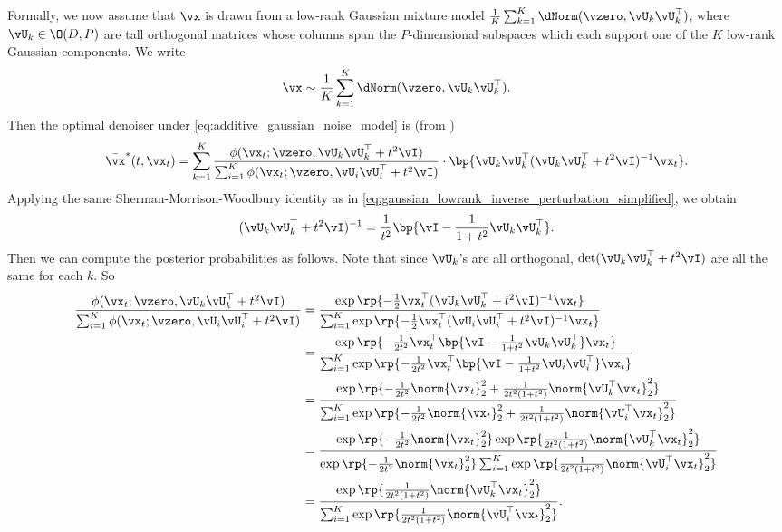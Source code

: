 \documentclass[../../book-main.tex]{subfiles}
\begin{document}
Formally, we now assume that \(\vx\) is drawn from a low-rank Gaussian mixture model \(\frac{1}{K}\sum_{k = 1}^{K}\dNorm(\vzero, \vU_{k}\vU_{k}^{\top})\), where  \(\vU_{k} \in \O(D, P)\) are tall orthogonal matrices whose columns span the \(P\)-dimensional subspaces which each support one of the \(K\) low-rank Gaussian components. We write
\begin{equation}\label{eq:MoG1}
	\vx \sim \frac{1}{K}\sum_{k = 1}^{K}\dNorm(\vzero, \vU_{k}\vU_{k}^{\top}).
\end{equation}
Then the optimal denoiser under \eqref{eq:additive_gaussian_noise_model} is (from )
\begin{equation} 
	\bar{\vx}^{\ast}(t, \vx_{t}) = \sum_{k = 1}^{K}\frac{\phi(\vx_{t} ; \vzero,
	\vU_{k}\vU_{k}^{\top} + t^{2}\vI)}{\sum_{i = 1}^{K}\phi(\vx_{t} ; \vzero, \vU_{i}\vU_{i}^{\top} + t^{2}\vI)}\cdot\bp{\vU_{k}\vU_{k}^{\top}(\vU_{k}\vU_{k}^{\top} + t^{2}\vI)^{-1}\vx_{t}}.
\end{equation}
Applying the same Sherman-Morrison-Woodbury identity as in \eqref{eq:gaussian_lowrank_inverse_perturbation_simplified}, we obtain
\begin{equation}
	(\vU_{k}\vU_{k}^{\top} + t^{2}\vI)^{-1} = \frac{1}{t^{2}}\bp{\vI - \frac{1}{1 + t^{2}}\vU_{k}\vU_{k}^{\top}}.
\end{equation}
Then we can compute the posterior probabilities as follows. Note that since \(\vU_{k}\)'s are all orthogonal, \(\det(\vU_{k}\vU_{k}^{\top} + t^{2}\vI)\) are all the same for each \(k\). So
\begin{align}
	\frac{\phi(\vx_{t} ; \vzero, \vU_{k}\vU_{k}^{\top} + t^{2}\vI)}{\sum_{i
	= 1}^{K}\phi(\vx_{t} ; \vzero, \vU_{i}\vU_{i}^{\top} + t^{2}\vI)} 
	&= \frac{\exp\rp{-\frac{1}{2}\vx_{t}^{\top}(\vU_{k}\vU_{k}^{\top} + t^{2}\vI)^{-1}\vx_{t}}}{\sum_{i = 1}^{K}\exp\rp{-\frac{1}{2}\vx_{t}^{\top}(\vU_{i}\vU_{i}^{\top} + t^{2}\vI)^{-1}\vx_{t}}} \\
	&= \frac{\exp\rp{-\frac{1}{2t^{2}}\vx_{t}^{\top}\bp{\vI - \frac{1}{1 + t^{2}}\vU_{k}\vU_{k}^{\top}}\vx_{t}}}{\sum_{i = 1}^{K}\exp\rp{-\frac{1}{2t^{2}}\vx_{t}^{\top}\bp{\vI - \frac{1}{1 + t^{2}}\vU_{i}\vU_{i}^{\top}}\vx_{t}}} \\
	&= \frac{\exp\rp{-\frac{1}{2t^{2}}\norm{\vx_{t}}_{2}^{2} + \frac{1}{2t^{2}(1 + t^{2})}\norm{\vU_{k}^{\top}\vx_{t}}_{2}^{2}}}{\sum_{i = 1}^{K}\exp\rp{-\frac{1}{2t^{2}}\norm{\vx_{t}}_{2}^{2} + \frac{1}{2t^{2}(1 + t^{2})}\norm{\vU_{i}^{\top}\vx_{t}}_{2}^{2}}} \\
	&= \frac{\exp\rp{-\frac{1}{2t^{2}}\norm{\vx_{t}}_{2}^{2}}\exp\rp{\frac{1}{2t^{2}(1 + t^{2})}\norm{\vU_{k}^{\top}\vx_{t}}_{2}^{2}}}{\exp\rp{-\frac{1}{2t^{2}}\norm{\vx_{t}}_{2}^{2}}\sum_{i = 1}^{K}\exp\rp{\frac{1}{2t^{2}(1 + t^{2})}\norm{\vU_{i}^{\top}\vx_{t}}_{2}^{2}}} \\
	&= \frac{\exp\rp{\frac{1}{2t^{2}(1 + t^{2})}\norm{\vU_{k}^{\top}\vx_{t}}_{2}^{2}}}{\sum_{i = 1}^{K}\exp\rp{\frac{1}{2t^{2}(1 + t^{2})}\norm{\vU_{i}^{\top}\vx_{t}}_{2}^{2}}}.
\end{align}
\end{document}
